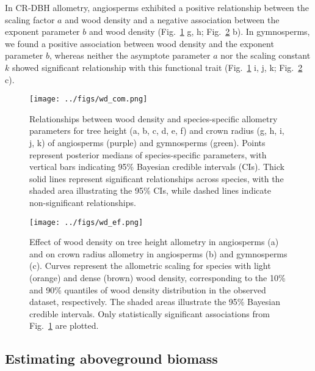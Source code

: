 \documentclass[
  12pt,
  letterpaper,
  DIV=11,
  numbers=noendperiod]{scrartcl}
\begin{document}
In CR-DBH allometry, angiosperms exhibited a positive relationship
between the scaling factor \(a\) and wood density and a negative
association between the exponent parameter \(b\) and wood density
(Fig.~\ref{fig-wood1} g, h; Fig.~\ref{fig-wood2} b). In gymnosperms, we
found a positive association between wood density and the exponent
parameter \(b\), whereas neither the asymptote parameter \(a\) nor the
scaling constant \(k\) showed significant relationship with this
functional trait (Fig.~\ref{fig-wood1} i, j, k; Fig.~\ref{fig-wood2} c).

\begin{figure}[H]

{\centering \texttt{[image: ../figs/wd\_com.png]}

}

\caption{\label{fig-wood1}Relationships between wood density and
species-specific allometry parameters for tree height (a, b, c, d, e, f)
and crown radius (g, h, i, j, k) of angiosperms (purple) and gymnosperms
(green). Points represent posterior medians of species-specific
parameters, with vertical bars indicating 95\% Bayesian credible
intervals (CIs). Thick solid lines represent significant relationships
across species, with the shaded area illustrating the 95\% CIs, while
dashed lines indicate non-significant relationships.}

\end{figure}

\begin{figure}[H]

{\centering \texttt{[image: ../figs/wd\_ef.png]}

}

\caption{\label{fig-wood2}Effect of wood density on tree height
allometry in angiosperms (a) and on crown radius allometry in
angiosperms (b) and gymnosperms (c). Curves represent the allometric
scaling for species with light (orange) and dense (brown) wood density,
corresponding to the 10\% and 90\% quantiles of wood density
distribution in the observed dataset, respectively. The shaded areas
illustrate the 95\% Bayesian credible intervals. Only statistically
significant associations from Fig.~\ref{fig-wood1} are plotted.}

\end{figure}

\hypertarget{estimating-aboveground-biomass}{%
\subsection{Estimating aboveground
biomass}\label{estimating-aboveground-biomass}}
\end{document}
